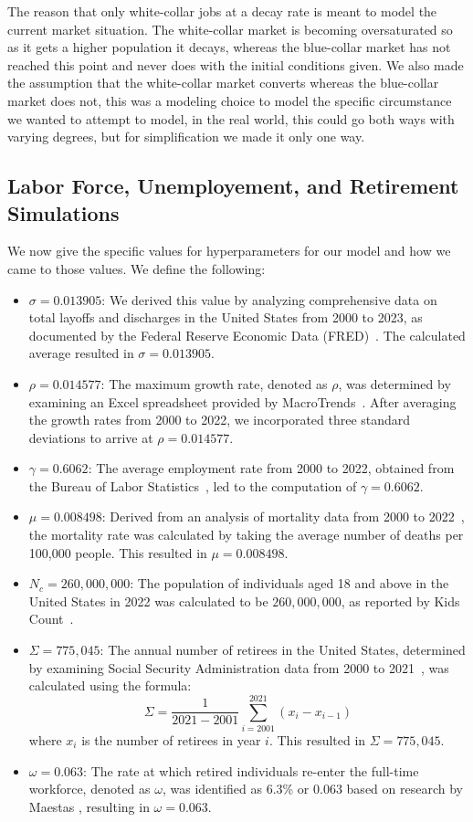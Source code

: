 \documentclass[11pt]{amsart}
\begin{document}
The reason that only white-collar jobs at a decay rate is meant to model the current market situation. The white-collar market is becoming
oversaturated so as it gets a higher population it decays, whereas the blue-collar market has not reached this point and never does with the initial conditions given.
We also made the assumption that the white-collar market converts whereas the blue-collar market does not, this was a modeling choice to model the specific
circumstance we wanted to attempt to model, in the real world, this could go both ways with varying degrees, but for simplification we made it only one way.

\subsection{Labor Force, Unemployement, and Retirement Simulations}

We now give the specific values for hyperparameters for our model and how we came to those values. We define the following:

\begin{itemize}
    \item $\sigma = 0.013905$: We derived this value by analyzing comprehensive data on total layoffs and discharges in the United States from 2000 to 2023, as documented by the Federal Reserve Economic Data (FRED)~\cite{FRED}. The calculated average resulted in $\sigma = 0.013905$.
    \item $\rho = 0.014577$: The maximum growth rate, denoted as $\rho$, was determined by examining an Excel spreadsheet provided by MacroTrends~\cite{MacroTrends}. After averaging the growth rates from 2000 to 2022, we incorporated three standard deviations to arrive at $\rho = 0.014577$.
    \item $\gamma = 0.6062$: The average employment rate from 2000 to 2022, obtained from the Bureau of Labor Statistics~\cite{BLS}, led to the computation of $\gamma = 0.6062$.
    \item $\mu = 0.008498$: Derived from an analysis of mortality data from 2000 to 2022~\cite{usafacts}, the mortality rate was calculated by taking the average number of deaths per 100,000 people. This resulted in $\mu = 0.008498$.
    \item $N_c = 260,000,000$: The population of individuals aged 18 and above in the United States in 2022 was calculated to be $260,000,000$, as reported by Kids Count~\cite{kidscount}.
    \item $\Sigma = 775,045$: The annual number of retirees in the United States, determined by examining Social Security Administration data from 2000 to 2021~\cite{ssa}, was calculated using the formula:
    \[
        \Sigma = \frac{1}{2021 - 2001}\sum_{i=2001}^{2021}(x_i - x_{i-1})
    \]
    where $x_i$ is the number of retirees in year $i$. This resulted in $\Sigma = 775,045$.
    \item $\omega = 0.063$: The rate at which retired individuals re-enter the full-time workforce, denoted as $\omega$, was identified as 6.3\% or $0.063$ based on research by Maestas \cite{maestas}, resulting in $\omega = 0.063$.
\end{itemize}
\end{document}
